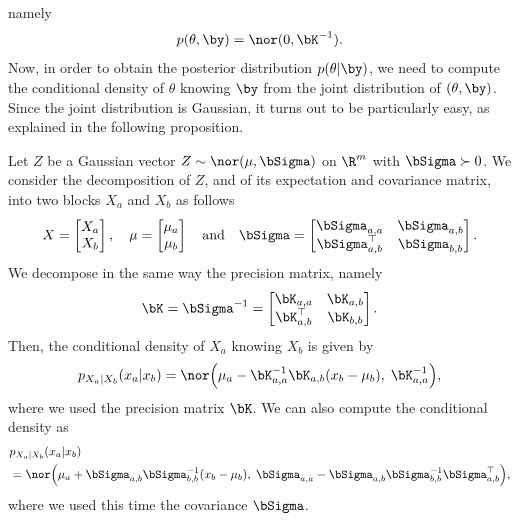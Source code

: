 namely 
\begin{equation*}
	p(\theta, \by) = \nor(0, \bK^{-1}).
\end{equation*}
Now, in order to obtain the posterior distribution $p(\theta | \by)$, we need to compute the conditional density of $\theta$ 
knowing $\by$ from the joint distribution of $(\theta, \by)$.
Since the joint distribution is Gaussian, it turns out to be particularly easy, as explained in the following proposition.
\begin{proposition}
	\label{prop:cond-gaussian-vector}
	Let $Z$ be a Gaussian vector $Z \sim \nor(\mu, \bSigma)$ on $\R^m$ with $\bSigma \succ 0$. 
	We consider the decomposition of $Z$, and of its expectation and covariance matrix, into two blocks $X_a$ and $X_b$ as follows
	\begin{equation*}
		X = 
		\begin{bmatrix}
			X_a \\
			X_b
		\end{bmatrix},
		\quad
		\mu =
		\begin{bmatrix}
			\mu_a \\
			\mu_b	
		\end{bmatrix}
		\quad \text{and} \quad
		\bSigma = 
		\begin{bmatrix}
			\bSigma_{a, a} & \bSigma_{a, b} \\
			\bSigma_{a, b}^\top & \bSigma_{b, b}
		\end{bmatrix}.
	\end{equation*}
	We decompose in the same way the precision matrix, namely
	\begin{equation}
		\bK = \bSigma^{-1} =
		\begin{bmatrix}
			\bK_{a, a} & \bK_{a, b} \\
			\bK_{a, b}^\top & \bK_{b, b}
		\end{bmatrix}.		
	\end{equation}
	Then, the conditional density of $X_a$ knowing $X_b$ is given by
	\begin{equation*}
		p_{X_a | X_b}(x_a | x_b) = 
		\nor \Big( \mu_a - \bK_{a, a}^{-1} \bK_{a, b} (x_b - \mu_b), 
		\; \bK_{a, a}^{-1} \Big),
	\end{equation*}
	where we used the precision matrix $\bK$. 
	We can also compute the conditional density as
	\begin{align*}
		&p_{X_a | X_b}(x_a | x_b) \\
		&= \nor \Big( \mu_a + \bSigma_{a, b} \bSigma_{b, b}^{-1} (x_b - \mu_b), 
		\; \bSigma_{a, a} - \bSigma_{a, b} \bSigma_{b, b}^{-1} \bSigma_{a, b}^\top \Big),	
	\end{align*}
	where we used this time the covariance $\bSigma$.
\end{proposition}
